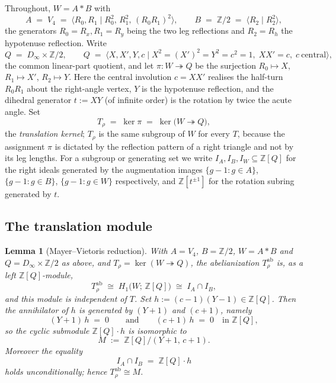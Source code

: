 \documentclass[11pt]{article}
\theoremstyle{plain}
\newtheorem{lemma}[theorem]{Lemma}
\theoremstyle{definition}
\theoremstyle{remark}
\begin{document}
Throughout, $W = A * B$ with
\[
A \;=\; V_4 \;=\; \langle R_0, R_1 \mid R_0^2,\, R_1^2,\, (R_0R_1)^2\rangle,
\qquad
B \;=\; \mathbb{Z}/2 \;=\; \langle R_2 \mid R_2^2 \rangle,
\]
the generators $R_0 = R_x, R_1 = R_y$ being the two leg reflections and
$R_2 = R_h$ the hypotenuse reflection.  Write
\[
Q \;=\; D_\infty \times \mathbb{Z}/2,
\qquad
Q \;=\; \langle X, X', Y, c \mid
X^2 = (X')^2 = Y^2 = c^2 = 1,\;
X X' = c,\; c\ \text{central}\rangle,
\]
the common linear-part quotient, and let
$\pi \colon W \twoheadrightarrow Q$ be the surjection
$R_0 \mapsto X$, $R_1 \mapsto X'$, $R_2 \mapsto Y$.  Here the central
involution $c = XX'$ realises the half-turn $R_0R_1$ about the
right-angle vertex, $Y$ is the hypotenuse reflection, and the dihedral
generator $t := XY$ (of infinite order) is the rotation by twice the
acute angle.  Set
\[
T_\rho \;=\; \ker\pi \;=\; \ker\bigl(W \twoheadrightarrow Q\bigr),
\]
the \emph{translation kernel}; $T_\rho$ is the same subgroup of $W$ for
every $T$, because the assignment $\pi$ is dictated by the reflection
pattern of a right triangle and not by its leg lengths.  For a subgroup
or generating set we write $I_A, I_B, I_W \subseteq \mathbb{Z}[Q]$ for
the right ideals generated by the augmentation images
$\{g - 1 : g \in A\}$, $\{g - 1 : g \in B\}$, $\{g-1 : g \in W\}$
respectively, and $\mathbb{Z}[t^{\pm 1}]$ for the rotation subring
generated by $t$.

\subsection{The translation module}

\begin{lemma}[Mayer--Vietoris reduction]
\label{lem:trans-mod}
With $A = V_4$, $B = \mathbb{Z}/2$, $W = A * B$ and
$Q = D_\infty \times \mathbb{Z}/2$ as above, and
$T_\rho = \ker(W \twoheadrightarrow Q)$, the abelianization
$T_\rho^{\mathrm{ab}}$ is, as a left $\mathbb{Z}[Q]$-module,
\[
T_\rho^{\mathrm{ab}} \;\cong\; H_1\bigl(W;\, \mathbb{Z}[Q]\bigr)
   \;\cong\; I_A \cap I_B,
\]
and this module is independent of $T$.  Set
$h := (c-1)(Y-1) \in \mathbb{Z}[Q]$.  Then the annihilator of $h$ is
generated by $(Y+1)$ and $(c+1)$, namely
\[
(Y+1)\,h \;=\; 0
\qquad\text{and}\qquad
(c+1)\,h \;=\; 0
\quad\text{in } \mathbb{Z}[Q],
\]
so the cyclic submodule $\mathbb{Z}[Q]\cdot h$ is isomorphic to
\[
M \;:=\; \mathbb{Z}[Q]\big/(Y+1,\, c+1).
\]
Moreover the equality
\[
I_A \cap I_B \;=\; \mathbb{Z}[Q]\cdot h
\]
holds unconditionally; hence $T_\rho^{\mathrm{ab}} \cong M$.
\end{lemma}
\end{document}
